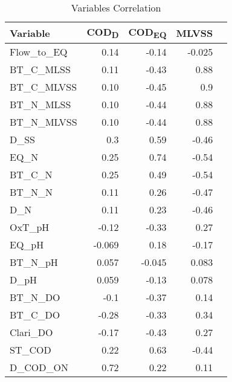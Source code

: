\begin{longtable}[h!]{@{}l *{2}{rr}}
\caption[Correlation Table]{Variables Correlation}
\label{t:correlation_table}
\\
%   
\toprule%


 {\bfseries Variable} & {\bfseries COD\textsubscript{D} } & {\bfseries COD\textsubscript{EQ}} & {\bfseries MLVSS}
\\

\cmidrule[0.4pt](r{0.125em}){1-1}%
\cmidrule[0.4pt](lr{0.125em}){2-4}%


  \endfirsthead

\endhead

        Flow\_to\_EQ & 0.14 & -0.14 & -0.025  \\ 
        BT\_C\_MLSS & 0.11 & -0.43 & 0.88  \\ 
        BT\_C\_MLVSS & 0.10 & -0.45 & 0.9  \\ 
        BT\_N\_MLSS & 0.10 & -0.44 & 0.88  \\ 
        BT\_N\_MLVSS & 0.10 & -0.44 & 0.88  \\ 
        D\_SS & 0.3 & 0.59 & -0.46  \\ 
        EQ\_N & 0.25 & 0.74 & -0.54  \\ 
        BT\_C\_N & 0.25 & 0.49 & -0.54  \\ 
        BT\_N\_N & 0.11 & 0.26 & -0.47  \\ 
        D\_N & 0.11 & 0.23 & -0.46  \\ 
        OxT\_pH & -0.12 & -0.33 & 0.27  \\ 
        EQ\_pH & -0.069 & 0.18 & -0.17  \\ 
        BT\_N\_pH & 0.057 & -0.045 & 0.083  \\ 
        D\_pH & 0.059 & -0.13 & 0.078  \\ 
        BT\_N\_DO & -0.1 & -0.37 & 0.14  \\ 
        BT\_C\_DO & -0.28 & -0.33 & 0.34  \\ 
        Clari\_DO & -0.17 & -0.43 & 0.27  \\ 
        ST\_COD & 0.22 & 0.63 & -0.44  \\ 
        D\_COD\_ON & 0.72 & 0.22 & 0.11  \\


\bottomrule

\end{longtable}
